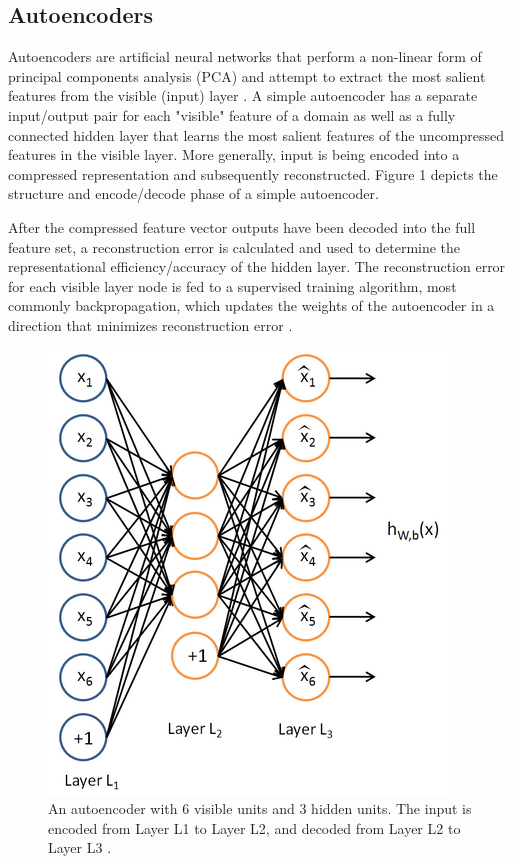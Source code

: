 \documentclass{acm_proc_article-sp}
\begin{document}
\subsection{Autoencoders}
Autoencoders are artificial neural networks that perform a non-linear form of principal components analysis (PCA) and attempt to extract the most salient features from the visible (input) layer \cite{Author}.  A simple autoencoder has a separate input/output pair for each "visible" feature of a domain as well as a fully connected hidden layer that learns the most salient features of the uncompressed features in the visible layer.  More generally, input is being encoded into a compressed representation and subsequently reconstructed.  Figure 1 depicts the structure and encode/decode phase of a simple autoencoder.

After the compressed feature vector outputs have been decoded into the full feature set, a reconstruction error is calculated and used to determine the representational efficiency/accuracy of the hidden layer.  The reconstruction error for each visible layer node is fed to a supervised training algorithm, most commonly backpropagation, which updates the weights of the autoencoder in a direction that minimizes reconstruction error \cite{Author}.

\begin{figure}[h]
\caption{An autoencoder with 6 visible units and 3 hidden units.  The input is encoded from Layer L1 to Layer L2, and decoded from Layer L2 to Layer L3 \cite{Author}.}
\centering
\includegraphics[scale=0.8]{ExampleAutoencoder}
\end{figure}
\end{document}
